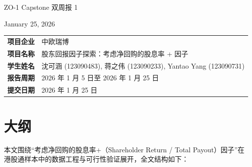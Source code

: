 \documentclass[a4paper,10pt]{article}
\begin{document}
\begin{center}
    \vspace*{1cm}
    {\Huge ZO-1 Capstone 双周报 1}
    
    \vspace{2.5cm}
    
    {\Large January 25, 2026}
    
    \vspace{1.5cm}
    
    \renewcommand{\arraystretch}{1.5}
    
    \begin{tabular}{@{} >{\bfseries}l l @{}}
    
        \toprule[1.5pt] %
        
        项目企业 & 中欧瑞博 \\
        
        项目名称 & 股东回报因子探索：考虑净回购的股息率 + 因子 \\
        
        学生姓名 & 沈可涵 (123090483), 蒋之伟 (123090233), Yantao Yang (123090731) \\
        
        报告周期 & 2026 年 1 月 5 日至 2026 年 1 月 25 日 \\
        
        提交日期 & 2026 年 1 月 25 日 \\
        
        \bottomrule[1.5pt] %
        
    \end{tabular}
\end{center}



\section{大纲}

本文围绕“考虑净回购的股息率+（Shareholder Return / Total Payout）因子”在港股通样本中的数据工程与可行性验证展开，全文结构如下：
\end{document}
